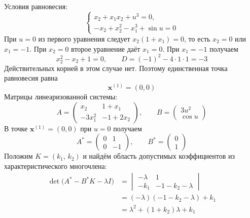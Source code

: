 Условия равновесия:
\begin{equation}
  \begin{cases}
    x_2+x_1x_2+u^3=0,\\
    -x_2+x_2^2-x_1^3+\sin u=0
  \end{cases}
\end{equation}
При $u=0$ из первого уравнения следует $x_2(1+x_1)=0$, то есть
$x_2=0$ или $x_1=-1$. При $x_2=0$ второе уравнение даёт $x_1=0$.
При $x_1=-1$ получаем
\begin{equation}
  x_2^2-x_2+1=0,\qquad D=(-1)^2-4\cdot1\cdot1=-3
\end{equation}
Действительных корней в этом случае нет. Поэтому единственная точка
равновесия равна
\begin{equation}
  \bm x^{(1)}=(0,0)
\end{equation}
Матрицы линеаризованной системы:
\begin{equation}
  A=
  \begin{pmatrix}
    x_2 & 1+x_1\\
    -3x_1^2 & -1+2x_2
  \end{pmatrix},
  \qquad
  B=
  \begin{pmatrix}
    3u^2\\
    \cos u
  \end{pmatrix}
\end{equation}
В точке $\bm x^{(1)}=(0,0)$ при $u=0$ получаем
\begin{equation}
  A^*=
  \begin{pmatrix}
    0 & 1\\
    0 & -1
  \end{pmatrix},
  \qquad
  B^*=
  \begin{pmatrix}
    0\\
    1
  \end{pmatrix}
\end{equation}
Положим $K=(k_1,\,k_2)$ и найдём область допустимых коэффициентов
из характеристического многочлена:
\begin{equation}
  \begin{aligned}
    \det\bigl(A^*-B^*K-\lambda I\bigr)
    &=\begin{vmatrix}
      -\lambda & 1\\
      -k_1 & -1-k_2-\lambda
    \end{vmatrix}\\
    &=(-\lambda)(-1-k_2-\lambda)+k_1\\
    &=\lambda^2+(1+k_2)\lambda+k_1
  \end{aligned}
\end{equation}

